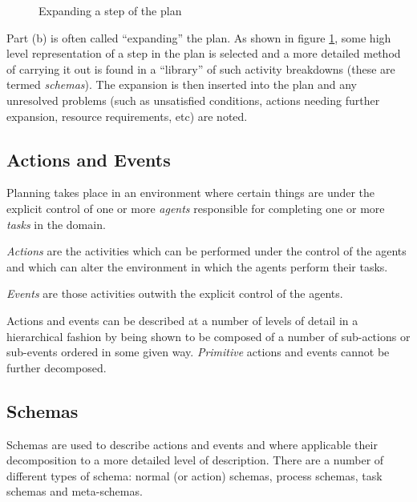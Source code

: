 \clearpage

\begin{figure}[htb]

\caption{Expanding a step of the plan}
\label{f-plan-expand}
\end{figure}

Part (b) is often called ``expanding'' the plan.  As shown in figure
\ref{f-plan-expand}, some high level representation of a step in the
plan is selected and a more detailed method of carrying it out is found
in a ``library'' of such activity breakdowns (these are termed {\em
schemas}).  The expansion is then inserted into the plan and any
unresolved problems (such as unsatisfied conditions, actions needing
further expansion, resource requirements, etc) are noted. 

\clearpage


\subsection{Actions and Events}
   

Planning takes place in an environment where certain things are under the
explicit control of one or more {\em agents} responsible for completing one or
more {\em tasks} in the domain.

{\em Actions} are the activities which can be performed under the control
of the agents and which can alter the environment in which the agents
perform their tasks.

{\em Events} are those activities outwith the explicit control of the agents.

Actions and events can be described at a number of levels of detail in a
hierarchical fashion by being shown to be composed of a number of sub-actions
or sub-events ordered in some given way.  {\em Primitive} actions and events
cannot be further decomposed.

\subsection{Schemas}
  
 
 
 

Schemas are used to describe actions and events and where applicable
their decomposition to a more detailed level of description.  There are
a number of different types of schema: normal (or action) schemas,
process schemas, task schemas and meta-schemas.

